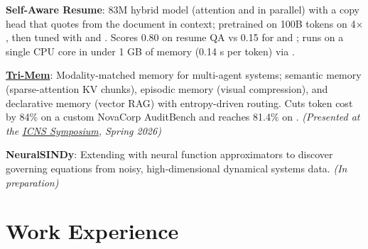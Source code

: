 \documentclass{ExpressiveResume}
\begin{document}
\noindent
\begin{minipage}[t]{0.94\textwidth}\raggedright
    \textbf{Self-Aware Resume}: 83M hybrid model (attention and  in parallel) with a copy head that quotes from the document in context; pretrained on 100B tokens on 4$\times$, then tuned with  and . Scores 0.80 on resume QA vs 0.15 for  and ; runs on a single CPU core in under 1 GB of memory (0.14 s per token) via .

    \medskip
    \textbf{\href{https://github.com/pandevim/TriMem}{Tri-Mem}}: Modality-matched memory for multi-agent systems; semantic memory (sparse-attention KV chunks), episodic memory (visual compression), and declarative memory (vector RAG) with entropy-driven routing. Cuts token cost by 84\% on a custom NovaCorp AuditBench and reaches 81.4\% on . \textit{(Presented at the \href{https://www.stevens.edu/icns-center-for-innovative-computing-and-networked-systems/symposium\#spring-2026}{ICNS Symposium}, Spring 2026)}

    \medskip
    \textbf{NeuralSINDy}: Extending  with neural function approximators to discover governing equations from noisy, high-dimensional dynamical systems data. \textit{(In preparation)}
\end{minipage}\par
\vspace{\spacenormal}

\section{Work Experience}



\end{document}
